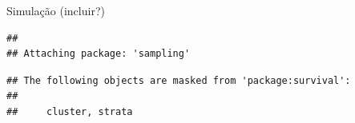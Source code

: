 \documentclass[]{book}
\newenvironment{Shaded}{\begin{snugshade}}{\end{snugshade}}
\newcommand{\KeywordTok}[1]{\textcolor[rgb]{0.13,0.29,0.53}{\textbf{{#1}}}}
\newcommand{\DecValTok}[1]{\textcolor[rgb]{0.00,0.00,0.81}{{#1}}}
\newcommand{\StringTok}[1]{\textcolor[rgb]{0.31,0.60,0.02}{{#1}}}
\newcommand{\OtherTok}[1]{\textcolor[rgb]{0.56,0.35,0.01}{{#1}}}
\newcommand{\NormalTok}[1]{{#1}}
\numberwithin{example}{chapter}
\numberwithin{remark}{chapter}
\numberwithin{definition}{chapter}
\begin{document}
Simulação (incluir?)

\begin{Shaded}
\end{Shaded}

\begin{verbatim}
## 
## Attaching package: 'sampling'
\end{verbatim}

\begin{verbatim}
## The following objects are masked from 'package:survival':
## 
##     cluster, strata
\end{verbatim}
\end{document}
